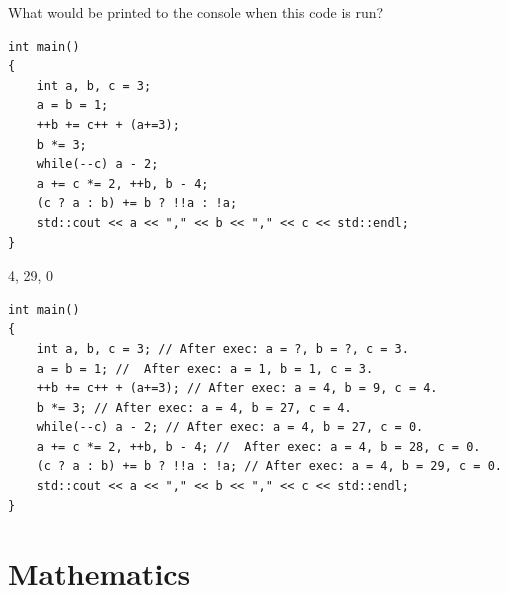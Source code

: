 \documentclass[answers]{exam}
\newcommand*{\ANCOAMATH}{}%
\begin{document}
\begin{questions}
\question What would be printed to the console when this code is run?
\begin{lstlisting}
int main()
{
    int a, b, c = 3;
    a = b = 1;
    ++b += c++ + (a+=3);
    b *= 3;
    while(--c) a - 2;
    a += c *= 2, ++b, b - 4;
    (c ? a : b) += b ? !!a : !a;
    std::cout << a << "," << b << "," << c << std::endl;
}
\end{lstlisting}
\begin{solution}[.2in]
4, 29, 0
\begin{lstlisting}
int main()
{
    int a, b, c = 3; // After exec: a = ?, b = ?, c = 3.
    a = b = 1; //  After exec: a = 1, b = 1, c = 3.
    ++b += c++ + (a+=3); // After exec: a = 4, b = 9, c = 4.
    b *= 3; // After exec: a = 4, b = 27, c = 4.
    while(--c) a - 2; // After exec: a = 4, b = 27, c = 0.
    a += c *= 2, ++b, b - 4; //  After exec: a = 4, b = 28, c = 0.
    (c ? a : b) += b ? !!a : !a; // After exec: a = 4, b = 29, c = 0.
    std::cout << a << "," << b << "," << c << std::endl;
}
\end{lstlisting}
\end{solution}

\end{questions}
\fi
\ifdefined\ANCOAMATH
\newpage
\section{Mathematics}
\end{document}
